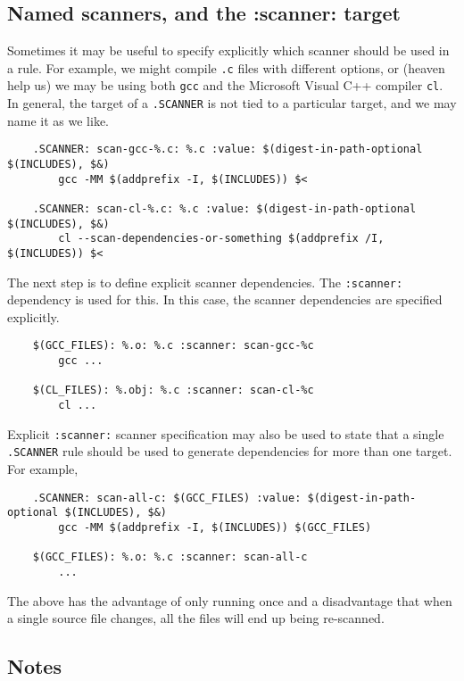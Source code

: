 \subsection{Named scanners, and the :scanner: target}

Sometimes it may be useful to specify explicitly which scanner should be used in a rule.  For
example, we might compile \verb+.c+ files with different options, or (heaven help us) we may be
using both \verb+gcc+ and the Microsoft Visual C++ compiler \verb+cl+. In general, the target of a
\verb+.SCANNER+ is not tied to a particular target, and we may name it as we like.

\begin{verbatim}
    .SCANNER: scan-gcc-%.c: %.c :value: $(digest-in-path-optional $(INCLUDES), $&)
        gcc -MM $(addprefix -I, $(INCLUDES)) $<

    .SCANNER: scan-cl-%.c: %.c :value: $(digest-in-path-optional $(INCLUDES), $&)
        cl --scan-dependencies-or-something $(addprefix /I, $(INCLUDES)) $<
\end{verbatim}

The next step is to define explicit scanner dependencies.  The \verb+:scanner:+ dependency is used
for this.  In this case, the scanner dependencies are specified explicitly.

\begin{verbatim}
    $(GCC_FILES): %.o: %.c :scanner: scan-gcc-%c
        gcc ...

    $(CL_FILES): %.obj: %.c :scanner: scan-cl-%c
        cl ...
\end{verbatim}

Explicit \verb+:scanner:+ scanner specification may also be used to state that a single
\verb+.SCANNER+ rule should be used to generate dependencies for more than one target. For example,

\begin{verbatim}
    .SCANNER: scan-all-c: $(GCC_FILES) :value: $(digest-in-path-optional $(INCLUDES), $&)
        gcc -MM $(addprefix -I, $(INCLUDES)) $(GCC_FILES)

    $(GCC_FILES): %.o: %.c :scanner: scan-all-c
        ...
\end{verbatim}

The above has the advantage of only running  once and a disadvantage that when a single
source file changes, all the files will end up being re-scanned.

\subsection{Notes}

